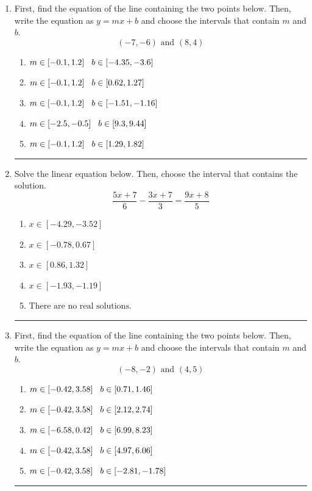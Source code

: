 \documentclass[14pt]{extbook}
\newcommand{\litem}[1]{\item#1\hspace*{-1cm}\rule{\textwidth}{0.4pt}}
\begin{document}
\begin{enumerate}
\litem{
First, find the equation of the line containing the two points below. Then, write the equation as $ y=mx+b $ and choose the intervals that contain $m$ and $b$.\[ (-7, -6) \text{ and } (8, 4) \]\begin{enumerate}[label=\Alph*.]
\item \( m \in [-0.1, 1.2] \hspace*{3mm} b \in [-4.35, -3.6] \)
\item \( m \in [-0.1, 1.2] \hspace*{3mm} b \in [0.62, 1.27] \)
\item \( m \in [-0.1, 1.2] \hspace*{3mm} b \in [-1.51, -1.16] \)
\item \( m \in [-2.5, -0.5] \hspace*{3mm} b \in [9.3, 9.44] \)
\item \( m \in [-0.1, 1.2] \hspace*{3mm} b \in [1.29, 1.82] \)

\end{enumerate} }
\litem{
Solve the linear equation below. Then, choose the interval that contains the solution.\[ \frac{5x + 7}{6} - \frac{3x + 7}{3} = \frac{9x + 8}{5} \]\begin{enumerate}[label=\Alph*.]
\item \( x \in [-4.29, -3.52] \)
\item \( x \in [-0.78, 0.67] \)
\item \( x \in [0.86, 1.32] \)
\item \( x \in [-1.93, -1.19] \)
\item \( \text{There are no real solutions.} \)

\end{enumerate} }
\litem{
First, find the equation of the line containing the two points below. Then, write the equation as $ y=mx+b $ and choose the intervals that contain $m$ and $b$.\[ (-8, -2) \text{ and } (4, 5) \]\begin{enumerate}[label=\Alph*.]
\item \( m \in [-0.42, 3.58] \hspace*{3mm} b \in [0.71, 1.46] \)
\item \( m \in [-0.42, 3.58] \hspace*{3mm} b \in [2.12, 2.74] \)
\item \( m \in [-6.58, 0.42] \hspace*{3mm} b \in [6.99, 8.23] \)
\item \( m \in [-0.42, 3.58] \hspace*{3mm} b \in [4.97, 6.06] \)
\item \( m \in [-0.42, 3.58] \hspace*{3mm} b \in [-2.81, -1.78] \)


\end{enumerate}}
\end{enumerate}
\end{document}
